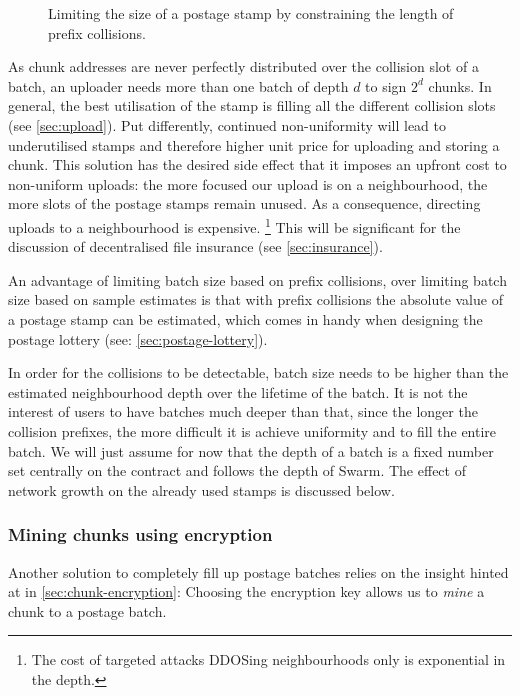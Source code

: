 \begin{figure}[htbp]
  \centering
  \caption[Limiting the size of a postage stamp]{Limiting the size of a postage stamp by constraining the length of prefix collisions.}
  \label{fig:prefix-collision}
\end{figure}


As chunk addresses are never perfectly distributed over the collision slot of a batch, an uploader needs more than one batch of depth $d$ to sign $2^d$ chunks. In general, the best utilisation of the stamp is filling all the different collision slots (see \ref{sec:upload}). Put differently, continued non-uniformity will lead to underutilised stamps and therefore higher unit price for uploading and storing a chunk. This solution has the desired side effect that it imposes an upfront cost to non-uniform uploads: the more focused our upload is on a neighbourhood, the more slots of the postage stamps remain unused. As a consequence, directing uploads to a neighbourhood is expensive.%
%
\footnote{The cost of targeted attacks DDOSing neighbourhoods only is exponential in the depth.}
%
This will be significant for the discussion of decentralised file insurance (see \ref{sec:insurance}). 

An advantage of limiting batch size based on prefix collisions, over limiting batch size based on sample estimates is that with prefix collisions the absolute value of a postage stamp can be estimated, which comes in handy when designing the postage lottery (see: \ref{sec:postage-lottery}). 


In order for the collisions to be detectable, batch size needs to be higher than the estimated neighbourhood depth over the lifetime of the batch. It is not the interest of users to have batches much deeper than that, since the longer the collision prefixes, the more difficult it is achieve uniformity and to fill the entire batch. We will just assume for now that the depth of a batch is a fixed number set centrally on the contract and follows the depth of Swarm. The effect of network growth on the already used stamps is discussed below.


\subsubsection{Mining chunks using encryption}

Another solution to completely fill up postage batches relies on the insight hinted at in \ref{sec:chunk-encryption}: Choosing the encryption key allows us to \emph{mine} a chunk to a postage batch.

